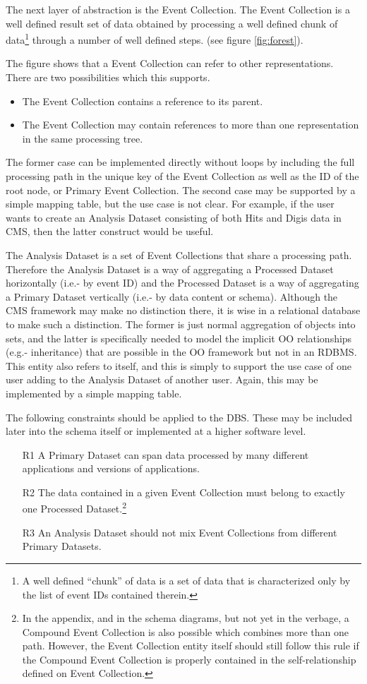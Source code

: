 \documentclass{cmspaper}
\begin{document}
The next layer of abstraction is the Event Collection.  The Event Collection is a 
well defined result set of data obtained by processing a well defined chunk
of data\footnote{A well defined ``chunk'' of data is a set of data that is 
characterized only by the list of event IDs contained therein.} through a 
number of well defined steps.  (see figure \ref{fig:forest}).

The figure shows that a Event Collection can refer to other representations.  There
are two possibilities which this supports.
\begin{itemize}
\item The Event Collection contains a reference to its parent. 
\item The Event Collection may contain references to more than one 
representation in the same processing tree.  
\end{itemize}
The former case can be implemented directly without loops by including the 
full processing path in the unique key of the Event Collection as well as the 
ID of the root node, or Primary Event Collection.  The second case may be
supported by a simple mapping table, but the use case is not clear.  For example, 
if the user wants to create an Analysis Dataset consisting of both Hits and 
Digis data in CMS, then the latter construct would be useful.

The Analysis Dataset is a set of Event Collections that share a processing path.  
Therefore the Analysis Dataset is a way of aggregating a Processed Dataset 
horizontally (i.e.- by event ID) and the Processed Dataset is a way of 
aggregating a Primary Dataset vertically (i.e.- by data content or schema). 
Although the CMS framework may make no distinction there, it is wise in a 
relational database to make such a distinction.  The former is just normal aggregation
of objects into sets, and the latter is specifically needed to model the implicit
OO relationships (e.g.- inheritance) that are possible in the OO framework
but not in an RDBMS. This entity also refers to itself, and this is simply to support
the use case of one user adding to the Analysis Dataset of another user.  Again, this
may be implemented by a simple mapping table.

The following constraints should be applied to the DBS.  These may be included 
later into the schema itself or implemented at a higher software level.
\begin{itemize}
\item[R1]  A Primary Dataset can span data processed by many 
different applications and versions of applications.  
\item[R2] The data contained in a given Event Collection must 
belong to exactly one Processed Dataset.\footnote{In the appendix, 
and in the schema diagrams, but not yet in the verbage, a Compound 
Event Collection is also possible which combines more than one path.
However, the Event Collection entity itself should still follow 
this rule if the Compound Event Collection is properly contained in the 
self-relationship defined on Event Collection.}  
\item[R3] An Analysis Dataset should not mix Event Collections from different 
Primary Datasets.
\end{itemize}
\end{document}
